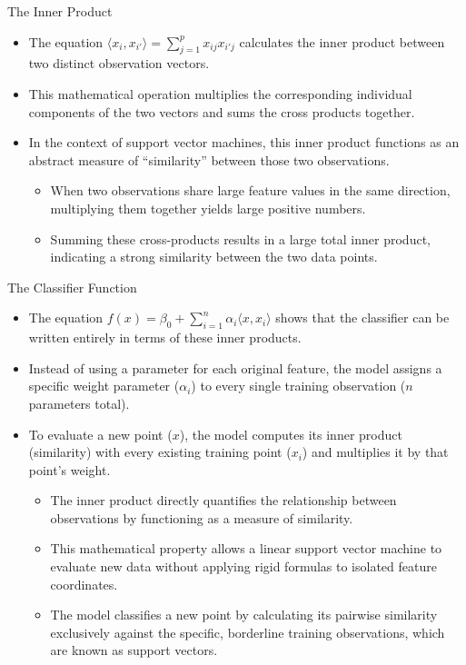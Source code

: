 \documentclass[aspectratio=169, 11pt]{beamer}
\begin{document}
\begin{frame}{The Inner Product}
    \begin{itemize}
        \item The equation \(\langle x_i, x_{i'} \rangle = \sum_{j=1}^p x_{ij}x_{i'j}\) calculates the inner product between two distinct observation vectors.
        \item This mathematical operation multiplies the corresponding individual components of the two vectors and sums the cross products together.
        \item In the context of support vector machines, this inner product functions as an abstract measure of ``similarity'' between those two observations.
        \pause
        \begin{itemize}
            \item When two observations share large feature values in the same direction, multiplying them together yields large positive numbers.
            \item Summing these cross-products results in a large total inner product, indicating a strong similarity between the two data points.
        \end{itemize}

    \end{itemize}
\end{frame}

\begin{frame}{The Classifier Function}
    \begin{itemize}
        \item The equation \(f(x) = \beta_0 + \sum_{i=1}^n \alpha_i \langle x, x_i \rangle\) shows that the classifier can be written entirely in terms of these inner products.
        \item Instead of using a parameter for each original feature, the model assigns a specific weight parameter (\(\alpha_i\)) to every single training observation (\(n\) parameters total).
        \item To evaluate a new point (\(x\)), the model computes its inner product (similarity) with every existing training point (\(x_i\)) and multiplies it by that point's weight.
        \pause
        \begin{itemize}
            \footnotesize
            \item The inner product directly quantifies the relationship between observations by functioning as a measure of similarity.
            \item This mathematical property allows a linear support vector machine to evaluate new data without applying rigid formulas to isolated feature coordinates.
            \item The model classifies a new point by calculating its pairwise similarity exclusively against the specific, borderline training observations, which are known as support vectors.
        \end{itemize}

    \end{itemize}
\end{frame}
\end{document}
